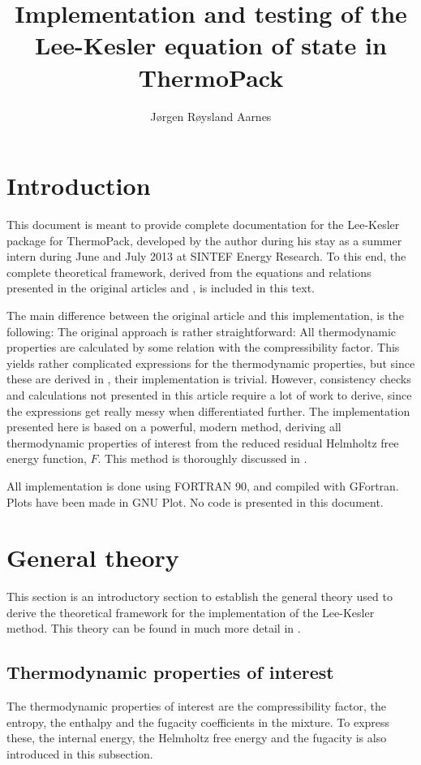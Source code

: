 \documentclass[internal,english]{sintefmemo2012}
\title{Implementation and testing of the Lee-Kesler equation of state in ThermoPack}
\author{J\o rgen R\o ysland Aarnes}
\numberwithin{equation}{section}
\begin{document}
\frontmatter

\tableofcontents

\section{Introduction}
This document is meant to provide complete documentation for the Lee-Kesler package for ThermoPack, developed by the author during his stay as a summer intern during June and July 2013 at SINTEF Energy Research. To this end, the complete theoretical framework, derived from the equations and relations presented in the original articles \cite{LK} and \cite{PKP}, is included in this text.

The main difference between the original article and this implementation, is the following: The original approach is rather straightforward: All thermodynamic properties are calculated by some relation with the compressibility factor. This yields rather complicated expressions for the thermodynamic properties, but since these are derived in \cite{LK}, their implementation is trivial. However, consistency checks and calculations not presented in this article require a lot of work to derive, since the expressions get really messy when differentiated further. The implementation presented here is based on a powerful, modern method, deriving all thermodynamic properties of interest from the reduced residual Helmholtz free energy function, $F$. This method is thoroughly discussed in \cite{MM}.

All implementation is done using FORTRAN 90, and compiled with GFortran. Plots have been made in GNU Plot. No code is presented in this document.  

\section{General theory}
This section is an introductory section to establish the general theory used to derive the theoretical framework for the implementation of the Lee-Kesler method. This theory can be found in much more detail in \cite{MM}.
\subsection{Thermodynamic properties of interest}

The thermodynamic properties of interest are the compressibility factor, the entropy, the enthalpy and the fugacity coefficients in the mixture. To express these, the internal energy, the Helmholtz free energy and the fugacity is also introduced in this subsection.
\end{document}
